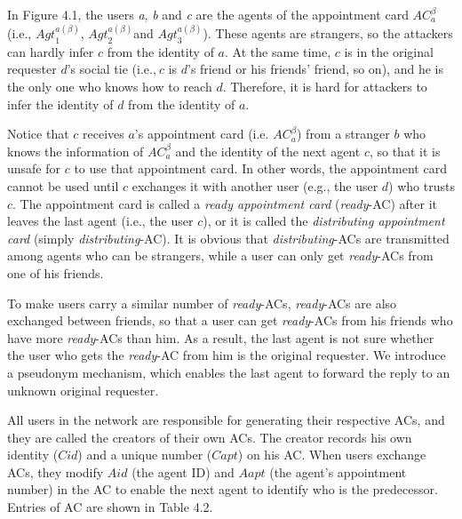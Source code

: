 In Figure 4.1, the users \textit{a}, \textit{b} and \textit{c} are the agents of the appointment card ${AC}^{\beta }_a$ (i.e., ${Agt}^{a\left(\beta \right)}_1$, ${Agt}^{a\left(\beta \right)}_2$and ${Agt}^{a\left(\beta \right)}_3$). These agents are strangers, so the attackers can hardly infer $c$ from the identity of $a$. At the same time, $c$ is in the original requester $d$'s social tie (i.e.,$\ c$ is $d$'s friend or his friends' friend, so on), and he is the only one who knows how to reach $d$. Therefore, it is hard for attackers to infer the identity of $d$ from the identity of $a$.

Notice that $c$ receives $a$'s appointment card (i.e. ${AC}^{\beta }_a$) from a stranger $b$ who knows the information of ${AC}^{\beta }_a$ and the identity of the next agent $c$, so that it is unsafe for $c$ to use that appointment card. In other words, the appointment card cannot be used until $c$ exchanges it with another user (e.g., the user $d$) who trusts $c$. The appointment card is called a \textit{ready appointment card} (\textit{ready}-AC) after it leaves the last agent (i.e., the user $c$), or it is called the \textit{distributing appointment card} (simply \textit{distributing}-AC). It is obvious that \textit{distributing}-ACs are transmitted among agents who can be strangers, while a user can only get \textit{ready}-ACs from  one of his friends.

To make users carry a similar number of \textit{ready}-ACs, \textit{ready}-ACs are also exchanged between friends, so that a user can get \textit{ready}-ACs from his friends who have more \textit{ready}-ACs than him. As a result, the last agent is not sure whether the user who gets the \textit{ready}-AC from him is the original requester. We introduce a pseudonym mechanism, which enables the last agent to forward the reply to an unknown original requester. 

All users in the network are responsible for generating their respective ACs, and they are called the creators of their own ACs. The creator records his own identity ($Cid$) and a unique number ($Capt$) on his AC. When users exchange ACs, they modify $Aid$ (the agent ID) and ${Aapt}$ (the agent's appointment number) in the AC to enable the next agent to identify who is the predecessor. Entries of AC are shown in Table 4.2.


